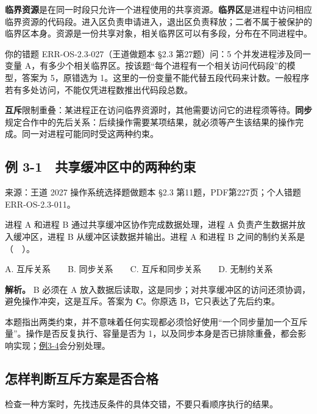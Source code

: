 \textbf{临界资源}是在同一时段只允许一个进程使用的共享资源。\textbf{临界区}是进程中访问相应临界资源的代码段。进入区负责申请进入，退出区负责释放；二者不属于被保护的临界区本身。资源是一份共享对象，相关临界区可以有多段，分布在不同进程中。

你的错题 ERR-OS-2.3-027（王道做题本 §2.3 第27题）问：5 个并发进程涉及同一变量 A，有多少个相关临界区。按该题``每个进程有一个相关访问代码段''的模型，答案为 5，原错选为 1。这里的一份变量不能代替五段代码来计数。一般程序若有多处访问，不能仅凭进程数推出代码段总数。

\textbf{互斥}限制重叠：某进程正在访问临界资源时，其他需要访问它的进程须等待。\textbf{同步}规定合作中的先后关系：后续操作需要某项结果，就必须等产生该结果的操作完成。同一对进程可能同时受这两种约束。

\subsection{例 3-1　共享缓冲区中的两种约束}\label{ex-err11}

来源：王道 2027 操作系统选择题做题本 §2.3 第11题，PDF第227页；个人错题 ERR-OS-2.3-011。

进程 A 和进程 B 通过共享缓冲区协作完成数据处理，进程 A 负责产生数据并放入缓冲区，进程 B 从缓冲区读数据并输出。进程 A 和进程 B 之间的制约关系是（　）。

A. 互斥关系　　B. 同步关系　　C. 互斥和同步关系　　D. 无制约关系


\textbf{解析。} B 必须在 A 放入数据后读取，这是同步；对共享缓冲区的访问还须协调，避免操作冲突，这是互斥。答案为 \textbf{C}。你原选 B，它只表达了先后约束。

本题指出两类约束，并不意味着任何实现都必须恰好使用``一个同步量加一个互斥量''。操作是否反复执行、容量是否为 1，以及同步本身是否已排除重叠，都会影响实现；\hyperref[ex-2024]{例3-4}会分别处理。

\subsection{怎样判断互斥方案是否合格}\label{ux600eux6837ux5224ux65adux4e92ux65a5ux65b9ux6848ux662fux5426ux5408ux683c}

检查一种方案时，先找违反条件的具体交错，不要只看顺序执行的结果。

